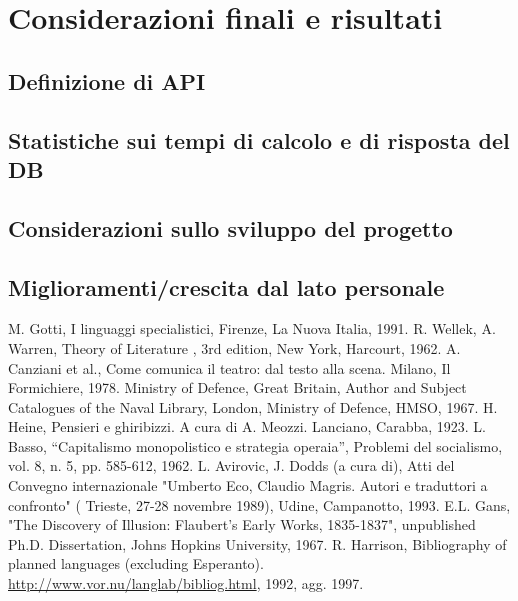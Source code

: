 \documentclass[12pt]{report}
\begin{document}
\chapter{Considerazioni finali e risultati}
\label{cap3}

\section{Definizione di API}

\newpage
\section{Statistiche sui tempi di calcolo e di risposta del DB}

\newpage
\section{Considerazioni sullo sviluppo del progetto}

\newpage
\section{Miglioramenti/crescita dal lato personale}


%
%

%
%
\begin{thebibliography}{00}
%
M. Gotti, I linguaggi specialistici, Firenze, La Nuova Italia, 1991.
%
R. Wellek, A. Warren, Theory of Literature , 3rd edition, New York, Harcourt, 1962.
%
A. Canziani et al., Come comunica il teatro: dal testo alla scena. Milano, Il Formichiere, 1978.
%
Ministry of Defence, Great Britain, Author and Subject Catalogues of the Naval Library, London, Ministry of Defence, HMSO, 1967.
%
H. Heine, Pensieri e ghiribizzi. A cura di A. Meozzi. Lanciano, Carabba, 1923.
%
L. Basso, ``Capitalismo monopolistico e strategia operaia'', Problemi del socialismo, vol. 8, n. 5, pp. 585-612, 1962.
%
L. Avirovic, J. Dodds (a cura di), Atti del Convegno internazionale "Umberto Eco, Claudio Magris. Autori e traduttori a confronto" ( Trieste, 27-28 novembre 1989), Udine, Campanotto, 1993.
%
E.L. Gans, "The Discovery of Illusion: Flaubert's Early Works, 1835-1837", unpublished Ph.D. Dissertation, Johns Hopkins University, 1967.
%
R. Harrison, Bibliography of planned languages (excluding Esperanto).  \url{http://www.vor.nu/langlab/bibliog.html}, 1992, agg. 1997.
%
\end{thebibliography}
% 
\end{document}
